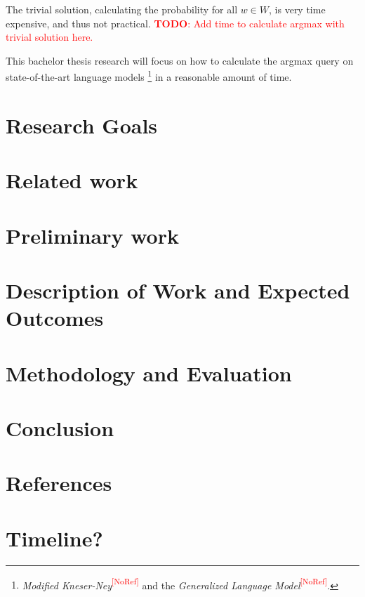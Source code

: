\documentclass[11pt,a4paper]{article}
\newcommand{\todo}[1]{\textcolor{red}{\textbf{TODO}: #1}}
\newcommand{\noref}{\textcolor{red}{\small \textsuperscript{[NoRef]}}}
\begin{document}
The trivial solution, calculating the probability for all $w \in W$, is very
time expensive, and thus not practical.
\todo{Add time to calculate argmax with trivial solution here.}

This bachelor thesis research will focus on how to calculate the argmax query
on state-of-the-art language models \footnote{\emph{Modified Kneser-Ney}\noref
and the \emph{Generalized Language Model}\noref.} in a reasonable amount of
time.

\section{Research Goals}

\section{Related work}

\section{Preliminary work}

\section{Description of Work and Expected Outcomes}

\section{Methodology and Evaluation}

\section{Conclusion}

\section{References}

\section{Timeline?}
\end{document}
